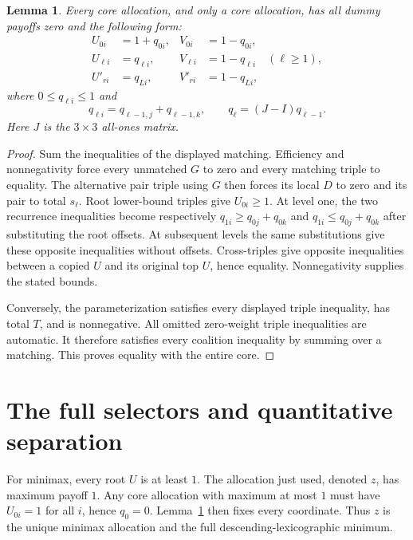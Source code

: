 \documentclass[11pt]{article}
\newtheorem{lemma}{Lemma}
\begin{document}
\begin{lemma}\label{lem:core}
Every core allocation, and only a core allocation, has all dummy payoffs zero
and the following form:
\begin{align*}
 U_{0i}&=1+q_{0i}, & V_{0i}&=1-q_{0i},\\
 U_{\ell i}&=q_{\ell i}, &V_{\ell i}&=1-q_{\ell i}\quad(\ell\ge1),\\
 U'_{ri}&=q_{Li}, &V'_{ri}&=1-q_{Li},
\end{align*}
where $0\le q_{\ell i}\le1$ and
\begin{equation}\label{eq:rec}
 q_{\ell i}=q_{\ell-1,j}+q_{\ell-1,k},\qquad
 q_\ell=(J-I)q_{\ell-1}.
\end{equation}
Here $J$ is the $3\times3$ all-ones matrix.
\end{lemma}
\begin{proof}
Sum the inequalities of the displayed matching. Efficiency and nonnegativity
force every unmatched $G$ to zero and every matching triple to equality.
The alternative pair triple using $G$ then forces its local $D$ to zero and
its pair to total $s_\ell$. Root lower-bound triples give $U_{0i}\ge1$.
At level one, the two recurrence inequalities become respectively
$q_{1i}\ge q_{0j}+q_{0k}$ and $q_{1i}\le q_{0j}+q_{0k}$ after substituting
the root offsets. At subsequent levels the same substitutions give these
opposite inequalities without offsets. Cross-triples give opposite inequalities
between a copied $U$ and its original top $U$, hence equality.
Nonnegativity supplies the stated bounds.

Conversely, the parameterization satisfies every displayed triple inequality,
has total $T$, and is nonnegative. All omitted zero-weight triple inequalities
are automatic. It therefore satisfies every coalition inequality by summing
over a matching. This proves equality with the entire core.
\end{proof}

\section{The full selectors and quantitative separation}
For minimax, every root $U$ is at least $1$. The allocation just used, denoted
$z$, has maximum payoff $1$. Any core allocation with maximum at most $1$
must have $U_{0i}=1$ for all $i$, hence $q_0=0$. Lemma~\ref{lem:core} then
fixes every coordinate. Thus $z$ is the unique minimax allocation and the
full descending-lexicographic minimum.
\end{document}
